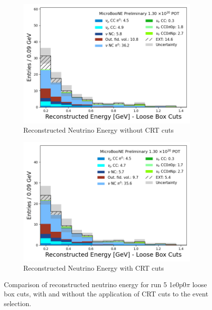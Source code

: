 \begin{figure}[H] \centering
    \begin{subfigure}[t]{0.45\linewidth}
        \includegraphics[width=\linewidth]{technote/EventSelections/FiguresCRT/run5_0p_loose.png}
        \caption{Reconstructed Neutrino Energy without CRT cuts}
    \end{subfigure}%
    \hspace{0.45cm}%
    \begin{subfigure}[t]{0.45\linewidth}
        \includegraphics[width=\linewidth]{technote/EventSelections/FiguresCRT/run5_0p_loose_crt.png}%
        \caption{Reconstructed Neutrino Energy with CRT cuts}
    \end{subfigure}%
    \caption{Comparison of reconstructed neutrino energy for run 5 1e0p0$\pi$ loose box cuts, with and without the application of CRT cuts to the event selection.}
    \label{fig:1e0p_loosecuts}
\end{figure}

